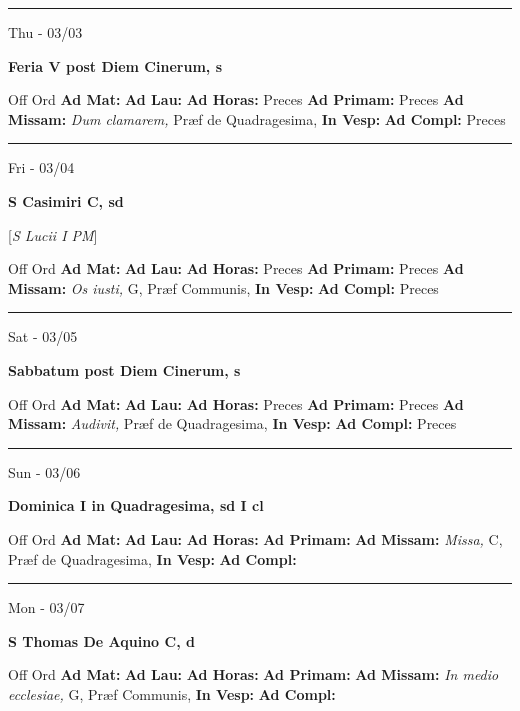 \documentclass[letterpaper, 10pt]{article}
\begin{document}
\hrule
\begin{center}
Thu - 03/03
\end{center}\textbf{ \large Feria V post Diem Cinerum, \textnormal{\normalsize s}}
\begin{justify}
Off Ord
\textbf{Ad Mat: }
\textbf{Ad Lau: }
\textbf{Ad Horas: }Preces
\textbf{Ad Primam: }Preces
\textbf{Ad Missam:} \textit{Dum clamarem, } Præf de Quadragesima, 
\textbf{In Vesp: }
\textbf{Ad Compl: }Preces\end{justify}



\hrule
\begin{center}
Fri - 03/04
\end{center}\textbf{ \large S Casimiri C, \textnormal{\normalsize sd}}

[\textit{S Lucii I PM}]
\begin{justify}
Off Ord
\textbf{Ad Mat: }
\textbf{Ad Lau: }
\textbf{Ad Horas: }Preces
\textbf{Ad Primam: }Preces
\textbf{Ad Missam:} \textit{Os iusti, } G, Præf Communis, 
\textbf{In Vesp: }
\textbf{Ad Compl: }Preces\end{justify}



\hrule
\begin{center}
Sat - 03/05
\end{center}\textbf{ \large Sabbatum post Diem Cinerum, \textnormal{\normalsize s}}
\begin{justify}
Off Ord
\textbf{Ad Mat: }
\textbf{Ad Lau: }
\textbf{Ad Horas: }Preces
\textbf{Ad Primam: }Preces
\textbf{Ad Missam:} \textit{Audivit, } Præf de Quadragesima, 
\textbf{In Vesp: }
\textbf{Ad Compl: }Preces\end{justify}



\hrule
\begin{center}
Sun - 03/06
\end{center}\textbf{ \large Dominica I in Quadragesima, \textnormal{\normalsize sd I cl}}
\begin{justify}
Off Ord
\textbf{Ad Mat: }
\textbf{Ad Lau: }
\textbf{Ad Horas: }
\textbf{Ad Primam: }
\textbf{Ad Missam:} \textit{Missa, } C, Præf de Quadragesima, 
\textbf{In Vesp: }
\textbf{Ad Compl: }\end{justify}



\hrule
\begin{center}
Mon - 03/07
\end{center}\textbf{ \large S Thomas De Aquino C, \textnormal{\normalsize d}}
\begin{justify}
Off Ord
\textbf{Ad Mat: }
\textbf{Ad Lau: }
\textbf{Ad Horas: }
\textbf{Ad Primam: }
\textbf{Ad Missam:} \textit{In medio ecclesiae, } G, Præf Communis, 
\textbf{In Vesp: }
\textbf{Ad Compl: }\end{justify}
\end{document}
